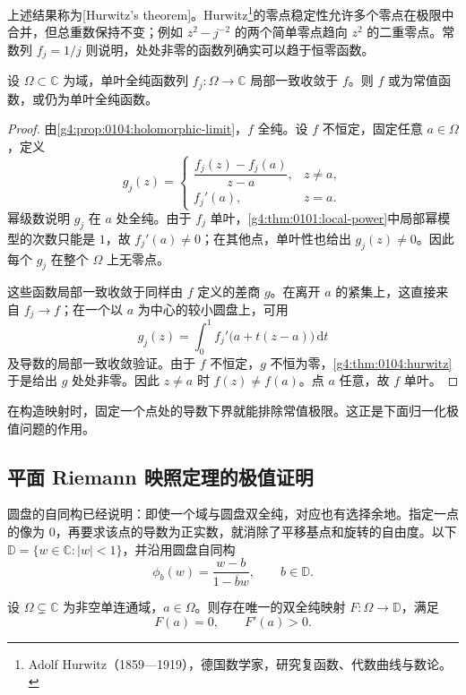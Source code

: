 上述结果称为[Hurwitz's theorem]。Hurwitz\footnote{Adolf Hurwitz（1859—1919），德国数学家，研究复函数、代数曲线与数论。}的零点稳定性允许多个零点在极限中合并，但总重数保持不变；例如 \(z^2-j^{-2}\) 的两个简单零点趋向 \(z^2\) 的二重零点。常数列 \(f_j=1/j\) 则说明，处处非零的函数列确实可以趋于恒零函数。

\begin{corollary}\label{g4:cor:0104:univalent-limit}
	设 \(\Omega\subset\mathbb C\) 为域，单叶全纯函数列 \(f_j:\Omega\to\mathbb C\) 局部一致收敛于 \(f\)。则 \(f\) 或为常值函数，或仍为单叶全纯函数。
\end{corollary}
\begin{proof}
	由\cref{g4:prop:0104:holomorphic-limit}，\(f\) 全纯。设 \(f\) 不恒定，固定任意 \(a\in\Omega\)，定义
	\[
		g_j(z)=
		\begin{cases}
			\dfrac{f_j(z)-f_j(a)}{z-a},&z\ne a,\\[6pt]
			f_j'(a),&z=a.
		\end{cases}
	\]
	幂级数说明 \(g_j\) 在 \(a\) 处全纯。由于 \(f_j\) 单叶，\cref{g4:thm:0101:local-power}中局部幂模型的次数只能是 \(1\)，故 \(f_j'(a)\ne0\)；在其他点，单叶性也给出 \(g_j(z)\ne0\)。因此每个 \(g_j\) 在整个 \(\Omega\) 上无零点。

	这些函数局部一致收敛于同样由 \(f\) 定义的差商 \(g\)。在离开 \(a\) 的紧集上，这直接来自 \(f_j\to f\)；在一个以 \(a\) 为中心的较小圆盘上，可用
	\[
		g_j(z)=\int_0^1 f_j'\bigl(a+t(z-a)\bigr)\,\mathrm dt
	\]
	及导数的局部一致收敛验证。由于 \(f\) 不恒定，\(g\) 不恒为零，\cref{g4:thm:0104:hurwitz}于是给出 \(g\) 处处非零。因此 \(z\ne a\) 时 \(f(z)\ne f(a)\)。点 \(a\) 任意，故 \(f\) 单叶。
\end{proof}

在构造映射时，固定一个点处的导数下界就能排除常值极限。这正是下面归一化极值问题的作用。

\subsection{平面 Riemann 映照定理的极值证明}
\label{g4:subsec:0104:03}

圆盘的自同构已经说明：即使一个域与圆盘双全纯，对应也有选择余地。指定一点的像为 \(0\)，再要求该点的导数为正实数，就消除了平移基点和旋转的自由度。以下 \(\mathbb D=\{w\in\mathbb C:|w|<1\}\)，并沿用圆盘自同构
\[
	\phi_b(w)=\frac{w-b}{1-\overline b w},
	\qquad b\in\mathbb D.
\]

\begin{theorem}\label{g4:thm:0104:riemann-mapping}
	设 \(\Omega\subsetneq\mathbb C\) 为非空单连通域，\(a\in\Omega\)。则存在唯一的双全纯映射 \(F:\Omega\to\mathbb D\)，满足
	\[
		F(a)=0,\qquad F'(a)>0.
	\]
\end{theorem}

